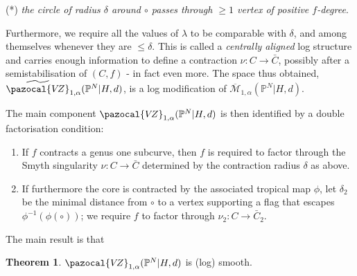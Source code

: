 \documentclass[11pt]{amsart}
\newcommand{\M}[4]{\overline{\mathcal{M}}_{#1,#2}(#3,#4)}
\newcommand{\PP}{\mathbb P}
\newcommand{\VZ}{\pazocal{V\!Z}}
\renewcommand{\to}{\rightarrow}
\theoremstyle{definition}
\newtheorem{thm}{Theorem}[section]
\theoremstyle{definition}
\begin{document}
(*) \emph{the circle of radius $\delta$ around $\circ$ passes through $\geq1$ vertex of positive $f$-degree}.

\noindent Furthermore, we require all the values of $\lambda$ to be comparable with $\delta$, and among themselves whenever they are $\leq \delta$. This is called a \emph{centrally aligned} log structure and carries enough information to define a contraction $\nu\colon C\to \bar{C}$, possibly after a semistabilisation of $(C,f)$ - in fact even more. The space thus obtained, $\widetilde \VZ_{1,\alpha}(\PP^N|H,d)$, is a log modification of $\M{1}{\alpha}{\PP^N|H}{d}$.

The main component $\VZ_{1,\alpha}(\PP^N|H,d)$ is then identified by a double factorisation condition:
\begin{enumerate}
 \item If $f$ contracts a genus one subcurve, then $f$ is required to factor through the Smyth singularity $\nu\colon C\to \bar C$ determined by the contraction radius $\delta$ as above.
 \item If furthermore the core is contracted by the associated tropical map $\phi$, let $\delta_2$ be the minimal distance from $\circ$ to a vertex supporting a flag that escapes $\phi^{-1}(\phi(\circ))$; we require $f$ to factor through $\nu_2\colon C\to\bar C_2$.
\end{enumerate}
The main result is that
\begin{thm}
 $\VZ_{1,\alpha}(\PP^N|H,d)$ is (log) smooth.
\end{thm}
\end{document}
